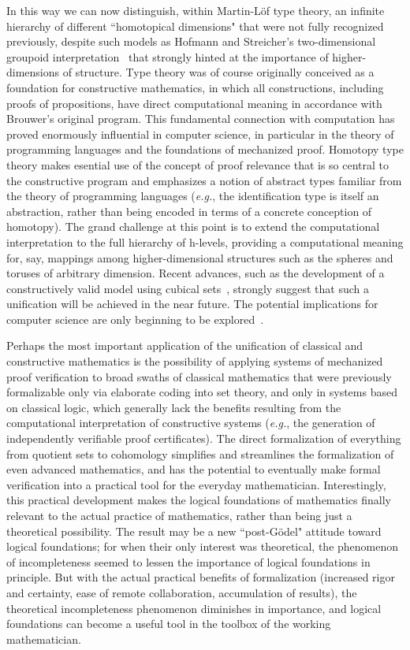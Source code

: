 \documentclass[11pt]{article}
\theoremstyle{remark}
\theoremstyle{definition}
\begin{document}
In this way we can now distinguish, within Martin-L\"{o}f type theory, an infinite hierarchy of different ``homotopical dimensions" that were not fully recognized previously, despite such models as Hofmann and Streicher's two-dimensional groupoid interpretation~\cite{HS} that strongly hinted at the importance of higher-dimensions of structure.
Type theory was of course originally conceived
as a foundation for constructive mathematics, in which all constructions, including proofs of propositions, have direct
computational meaning in accordance with Brouwer's original program.  This fundamental connection with computation has
proved enormously influential in computer science, in particular in the theory of programming languages and the
foundations of mechanized proof.  Homotopy type theory makes esential use of the concept of proof relevance that is so
central to the constructive program and emphasizes a notion of abstract types familiar from the theory of programming
languages (\textit{e.g.}, the identification type is itself an abstraction, rather than being encoded in terms of a
concrete conception of homotopy).  The grand challenge at this point is to extend the computational interpretation to
the full hierarchy of h-levels, providing a computational meaning for, say, mappings among higher-dimensional structures
such as the spheres and toruses of arbitrary dimension.  Recent advances, such as the development of a constructively
valid model using cubical sets~\cite{BCH}, strongly suggest that such a unification will be achieved in the near future.
The potential implications for computer science are only beginning to be explored~\cite{AMLH}.

Perhaps the most important application of the unification of classical and constructive mathematics is the possibility of
applying systems of mechanized proof verification to broad swaths of classical mathematics that were previously
formalizable only via elaborate coding into set theory, and only in systems based on classical logic, which generally
lack the benefits resulting from the computational interpretation of constructive systems (\textit{e.g.}, the generation of
independently verifiable proof certificates).  The direct formalization of everything from quotient sets to cohomology simplifies 
and streamlines the formalization of even advanced mathematics, and has the
potential to eventually make formal verification into a practical tool for the everyday mathematician.  Interestingly,
this practical development makes the logical foundations of mathematics finally relevant to the actual practice of
mathematics, rather than being just a theoretical possibility.  The result may be a new ``post-G\"odel" attitude toward
logical foundations; for when their only interest was theoretical, the phenomenon of incompleteness seemed to lessen the
importance of logical foundations in principle.  But with the actual practical benefits of formalization (increased
rigor and certainty, ease of remote collaboration, accumulation of results), the theoretical incompleteness phenomenon
diminishes in importance, and logical foundations can become a useful tool in the toolbox of the working mathematician.
\end{document}
